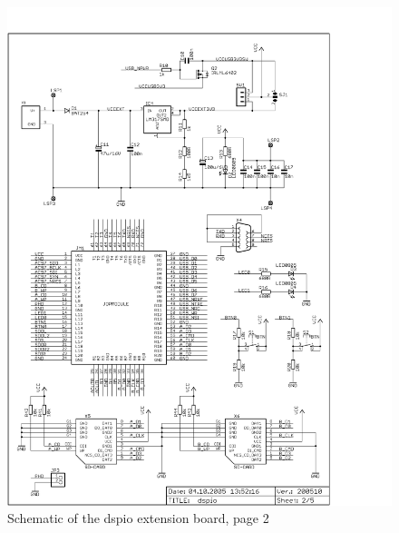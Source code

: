 \begin{figure}
    \centering
    \includegraphics[scale=0.68]{appendix/dspio_p2}
    \caption{Schematic of the dspio extension board, page 2}
\end{figure}
